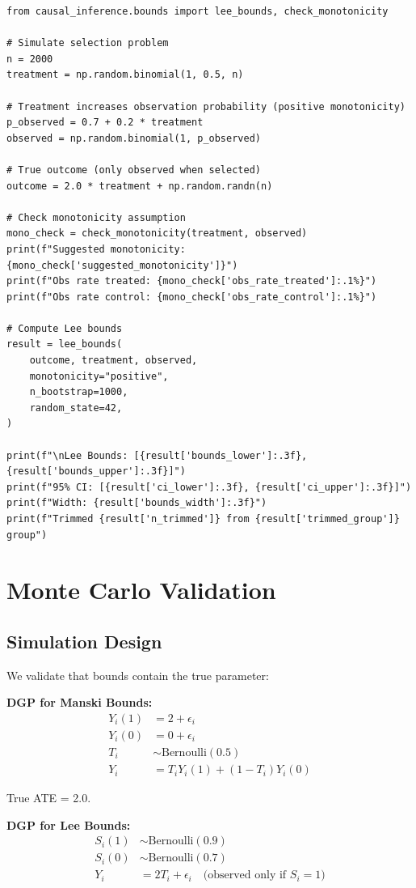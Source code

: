 \begin{verbatim}
from causal_inference.bounds import lee_bounds, check_monotonicity

# Simulate selection problem
n = 2000
treatment = np.random.binomial(1, 0.5, n)

# Treatment increases observation probability (positive monotonicity)
p_observed = 0.7 + 0.2 * treatment
observed = np.random.binomial(1, p_observed)

# True outcome (only observed when selected)
outcome = 2.0 * treatment + np.random.randn(n)

# Check monotonicity assumption
mono_check = check_monotonicity(treatment, observed)
print(f"Suggested monotonicity: {mono_check['suggested_monotonicity']}")
print(f"Obs rate treated: {mono_check['obs_rate_treated']:.1%}")
print(f"Obs rate control: {mono_check['obs_rate_control']:.1%}")

# Compute Lee bounds
result = lee_bounds(
    outcome, treatment, observed,
    monotonicity="positive",
    n_bootstrap=1000,
    random_state=42,
)

print(f"\nLee Bounds: [{result['bounds_lower']:.3f}, {result['bounds_upper']:.3f}]")
print(f"95% CI: [{result['ci_lower']:.3f}, {result['ci_upper']:.3f}]")
print(f"Width: {result['bounds_width']:.3f}")
print(f"Trimmed {result['n_trimmed']} from {result['trimmed_group']} group")
\end{verbatim}


\section{Monte Carlo Validation}
\label{sec:bounds_validation}

\subsection{Simulation Design}

We validate that bounds contain the true parameter:

\textbf{DGP for Manski Bounds:}
\begin{align*}
Y_i(1) &= 2 + \epsilon_i \\
Y_i(0) &= 0 + \epsilon_i \\
T_i &\sim \text{Bernoulli}(0.5) \\
Y_i &= T_i Y_i(1) + (1 - T_i) Y_i(0)
\end{align*}

True ATE = 2.0.

\textbf{DGP for Lee Bounds:}
\begin{align*}
S_i(1) &\sim \text{Bernoulli}(0.9) \\
S_i(0) &\sim \text{Bernoulli}(0.7) \\
Y_i &= 2 T_i + \epsilon_i \quad \text{(observed only if } S_i = 1\text{)}
\end{align*}

